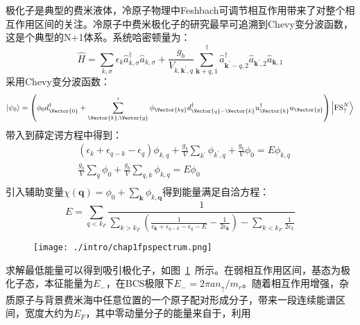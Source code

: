 极化子是典型的费米液体，冷原子物理中Feshbach可调节相互作用带来了对整个相互作用区间的关注。冷原子中费米极化子的研究最早可追溯到Chevy变分波函数\cite{chevy2006}，这是个典型的N+1体系。系统哈密顿量为：
\begin{equation}
\hat{H}=\sum_{k, \sigma} \epsilon_{k} \hat{a}_{k, \sigma}^{\dagger} \hat{a}_{k, \sigma}+\frac{g_{b}}{V_{k, \boldsymbol{k}^{\prime}, q}} \sum_{\boldsymbol{k}+q, 1}^{\dagger} \hat{a}_{\boldsymbol{k}^{\prime}-q, 2}^{\dagger} \hat{a}_{\boldsymbol{k}^{\prime}, 2} \hat{a}_{\boldsymbol{k}, 1}
\end{equation}
采用Chevy变分波函数：
\begin{equation}
\left|\psi_{0}\right\rangle=\left(\phi_{0} d_{\Vector{0}}^{\dagger}+\sum_{\Vector{k}, \Vector{q}}^{\prime} \phi_{\Vector{k q}} d_{\Vector{q}-\Vector{k}}^{\dagger} u_{\Vector{k}}^{\dagger} u_{\Vector{q}}\right)\left|\mathrm{FS}_{\uparrow}^{N}\right\rangle
\end{equation}
带入到薛定谔方程中得到：
\begin{equation}
\begin{split}
&\left(\epsilon_{k}+\epsilon_{q-k}-\epsilon_{q}\right) \phi_{k, q}+\frac{g_{b}}{V} \sum_{k^{\prime}} \phi_{k^{\prime}, q}+\frac{g_{b}}{V} \phi_{0}=E \phi_{k, q}\\
&\frac{g_{b}}{V} \sum_{q} \phi_{0}+\frac{g_{b}}{V} \sum_{q, k} \phi_{k, q}=E \phi_{0}\\
\end{split}
\end{equation}
引入辅助变量$\chi(\boldsymbol{q})=\phi_{0}+\sum_{\boldsymbol{k}} \phi_{k, \boldsymbol{q}}$得到能量满足自洽方程：
\begin{equation}
E=\sum_{q<k_{F}} \frac{1}{\sum_{k>k_{F}}\left(\frac{1}{\epsilon_{\boldsymbol{k}}+\epsilon_{q-k}-\epsilon_{q}-E}-\frac{1}{2 \epsilon_{\boldsymbol{k}}}\right)-\sum_{k<k_{F}} \frac{1}{2 \epsilon_{k}}} \label{consistentEQ}
\end{equation}
\begin{figure}[!htbp]
    \centering
    \texttt{[image: ./intro/chap1fpspectrum.png]}
    \label{fpchevyE}
\end{figure}
求解最低能量可以得到吸引极化子，如图~\ref{fpchevyE}~所示。在弱相互作用区间，基态为极化子态，本征能量为$E_-$，在BCS极限下$E_{-}=2 \pi a n_{\uparrow} / m_{r}$。随着相互作用增强，杂质原子与背景费米海中任意位置的一个原子配对形成分子，带来一段连续能谱区间，宽度大约为$E_F$，其中零动量分子的能量来自于\cite{Mora_pm,Punk_pm,combescot2010analytical,Trefzger2012Impurity}，利用
